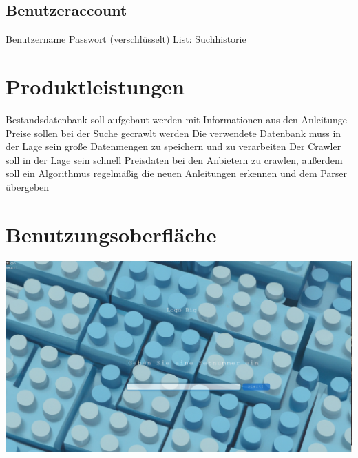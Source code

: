 \subsection{Benutzeraccount}
Benutzername \newline
Passwort (verschlüsselt) \newline
List: Suchhistorie \newline

\section{Produktleistungen}
Bestandsdatenbank soll aufgebaut werden mit Informationen aus den Anleitunge \newline
Preise sollen bei der Suche gecrawlt werden \newline
Die verwendete Datenbank muss in der Lage sein große Datenmengen zu speichern und zu verarbeiten \newline
Der Crawler soll in der Lage sein schnell Preisdaten bei den Anbietern zu crawlen, außerdem soll ein Algorithmus regelmäßig die neuen Anleitungen erkennen und dem Parser übergeben \newline

\section{Benutzungsoberfläche}
\includegraphics[width=18cm]{pictures/programmvorschau3.png}

